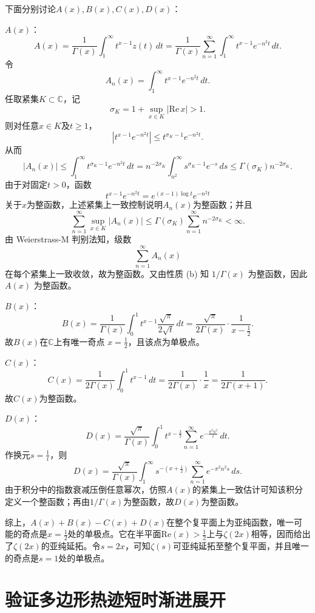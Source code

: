 \documentclass[UTF8,zihao=5,linespread=1.34]{ctexart}
\theoremstyle{cnplain}
\theoremstyle{cnremark}
\begin{document}
下面分别讨论$A(x),B(x),C(x),D(x)$：

$A(x)$：
\[
A(x)
=
\frac{1}{\Gamma(x)}
\int_{1}^{\infty}t^{x-1}z(t)\,dt
=
\frac{1}{\Gamma(x)}
\sum_{n=1}^{\infty}
\int_{1}^{\infty}t^{x-1}e^{-n^{2}t}\,dt.
\]
令
\[
A_n(x)=\int_{1}^{\infty}
t^{x-1}e^{-n^{2}t}\,dt.
\]
任取紧集$K\subset\mathbb{C}$，记
\[
\sigma_K
=
1+\sup_{x\in K}|\mathrm{Re}\,x|>1.
\]
则对任意$x\in K$及$t\geq1$，
\[
|t^{x-1}e^{-n^{2}t}|
\leq
t^{\sigma_K-1}e^{-n^{2}t}.
\]
从而
\[
|A_n(x)|
\leq
\int_{1}^{\infty}t^{\sigma_K-1}e^{-n^{2}t}\,dt
=
n^{-2\sigma_K}
\int_{n^{2}}^{\infty}s^{\sigma_K-1}e^{-s}\,ds
\leq
\Gamma(\sigma_K)n^{-2\sigma_K}.
\]
由于对固定$t>0$，函数
\[
t^{x-1}e^{-n^{2}t}
=
e^{(x-1)\log t}e^{-n^{2}t}
\]
关于$x$为整函数，上述紧集上一致控制说明$A_n(x)$为整函数；并且
\[
\sum_{n=1}^{\infty}
\sup_{x\in K}|A_n(x)|
\leq
\Gamma(\sigma_K)
\sum_{n=1}^{\infty}n^{-2\sigma_K}
<\infty.
\]
由 Weierstrass-M 判别法知，级数
\[
\sum_{n=1}^{\infty}A_n(x)
\]
在每个紧集上一致收敛，故为整函数。又由性质 (b) 知 $1/\Gamma(x)$ 为整函数，因此 $A(x)$ 为整函数。

$B(x)$：
\[
B(x)
=
\frac{1}{\Gamma(x)}
\int_{0}^{1}t^{x-1}
\frac{\sqrt{\pi}}{2\sqrt{t}}\,dt
=
\frac{\sqrt{\pi}}{2\Gamma(x)}
\cdot\frac{1}{x-\frac{1}{2}}.
\]
故$B(x)$在$\mathbb{C}$上有唯一奇点
$x=\frac{1}{2}$，且该点为单极点。

$C(x)$：
\[
C(x)
=
\frac{1}{2\Gamma(x)}
\int_{0}^{1}t^{x-1}\,dt
=
\frac{1}{2\Gamma(x)}\cdot\frac{1}{x}
=
\frac{1}{2\Gamma(x+1)}.
\]
故$C(x)$为整函数。

$D(x)$：
\[
D(x)
=
\frac{\sqrt{\pi}}{\Gamma(x)}
\int_{0}^{1}t^{x-\frac{3}{2}}
\sum_{n=1}^{\infty}
e^{-\frac{\pi^{2}n^{2}}{t}}\,dt.
\]
作换元$s=\frac{1}{t}$，则
\[
D(x)
=
\frac{\sqrt{\pi}}{\Gamma(x)}
\int_{1}^{\infty}s^{-(x+\frac{1}{2})}
\sum_{n=1}^{\infty}
e^{-\pi^{2}n^{2}s}\,ds.
\]
由于积分中的指数衰减压倒任意幂次，仿照$A(x)$的紧集上一致估计可知该积分定义一个整函数；再由$1/\Gamma(x)$为整函数，故$D(x)$为整函数。

综上，$A(x)+B(x)-C(x)+D(x)$在整个复平面上为亚纯函数，唯一可能的奇点是$x=\frac{1}{2}$处的单极点。它在半平面$\mathrm{Re}(x)>\frac{1}{2}$上与$\zeta(2x)$相等，因而给出了$\zeta(2x)$的亚纯延拓。令$s=2x$，可知$\zeta(s)$可亚纯延拓至整个复平面，并且唯一的奇点是$s=1$处的单极点。

\newpage
\section{验证多边形热迹短时渐进展开}
\end{document}
